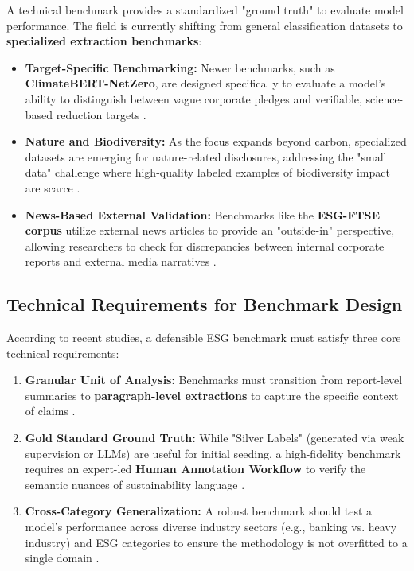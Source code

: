 \documentclass[english, online, cse, master]{dithesis}
\begin{document}
A technical benchmark provides a standardized "ground truth" to evaluate model performance. The field is currently shifting from general classification datasets to \textbf{specialized extraction benchmarks}:
\begin{itemize}
\item 

\textbf{Target-Specific Benchmarking:} Newer benchmarks, such as \textbf{ClimateBERT-NetZero}, are designed specifically to evaluate a model's ability to distinguish between vague corporate pledges and verifiable, science-based reduction targets  \parencite{tobias_schimanski_241ada20}.\item 

\textbf{Nature and Biodiversity:} As the focus expands beyond carbon, specialized datasets are emerging for nature-related disclosures, addressing the "small data" challenge where high-quality labeled examples of biodiversity impact are scarce  \parencite{tobias_schimanski_3549ff9f}.\item 

\textbf{News-Based External Validation:} Benchmarks like the \textbf{ESG-FTSE corpus} utilize external news articles to provide an "outside-in" perspective, allowing researchers to check for discrepancies between internal corporate reports and external media narratives  \parencite[]{fabian_billert_a5fbb687, mariya_pavlova_259be499}.
\end{itemize}
\subsection{Technical Requirements for Benchmark Design}

According to recent studies, a defensible ESG benchmark must satisfy three core technical requirements:
\begin{enumerate}
\item 

\textbf{Granular Unit of Analysis:} Benchmarks must transition from report-level summaries to \textbf{paragraph-level extractions} to capture the specific context of claims  \parencite{jacob_beck_9548a833}.\item 

\textbf{Gold Standard Ground Truth:} While "Silver Labels" (generated via weak supervision or LLMs) are useful for initial seeding, a high-fidelity benchmark requires an expert-led \textbf{Human Annotation Workflow} to verify the semantic nuances of sustainability language  \parencite[]{keane_ong_369a0b63, chong_xu_bff21576}.\item 

\textbf{Cross-Category Generalization:} A robust benchmark should test a model's performance across diverse industry sectors (e.g., banking vs. heavy industry) and ESG categories to ensure the methodology is not overfitted to a single domain  \parencite[]{yinan_yu_e282fd98, keane_ong_369a0b63}.
\end{enumerate}
\end{document}

